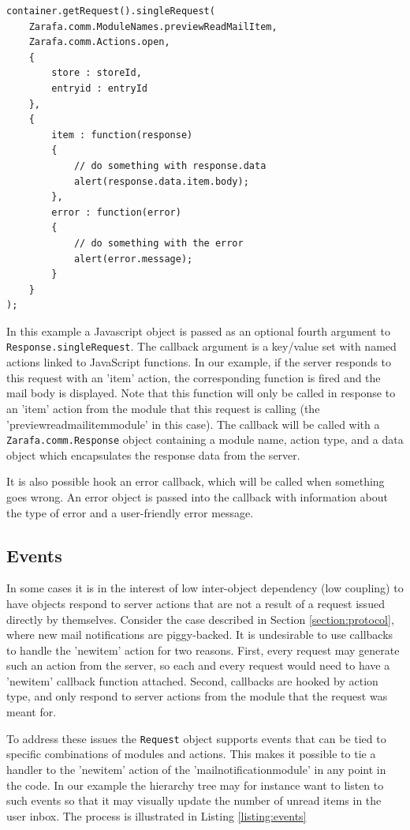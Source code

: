 \begin{lstlisting}[caption={Using callbacks}, label=listing:callbacks]
container.getRequest().singleRequest(
	Zarafa.comm.ModuleNames.previewReadMailItem,
	Zarafa.comm.Actions.open,
	{
		store : storeId,
		entryid : entryId
	},
	{
		item : function(response)
		{
			// do something with response.data
			alert(response.data.item.body);
		},
		error : function(error)
		{
			// do something with the error
			alert(error.message);
		}
	}
);
\end{lstlisting}

In this example a Javascript object is passed as an optional fourth argument to {\tt Response.singleRequest}.
The callback argument is a key/value set with named actions linked to JavaScript functions. In our example,
if the server responds to this request with an 'item' action, the corresponding function is fired and the
mail body is displayed. Note that this function will only be called in response to an 'item' action from
the module that this request is calling (the 'previewreadmailitemmodule' in this case). The callback
will be called with a {\tt Zarafa.comm.Response} object containing a module name, action type, and a data
object which encapsulates the response data from the server.

It is also possible hook an error callback, which will be called when something goes wrong. An error
object is passed into the callback with information about the type of error and a user-friendly error 
message.

\subsection{Events}

In some cases it is in the interest of low inter-object dependency (low coupling) to have objects respond
to server actions that are not a result of a request issued directly by themselves. Consider the case
described in Section \ref{section:protocol}, where new mail notifications are piggy-backed. It is undesirable
to use callbacks to handle the 'newitem' action for two reasons. First, every request may generate such an 
action from the server, so each and every request would need to have a 'newitem' callback function attached. 
Second, callbacks are hooked by action type, and only respond to server actions from the module that the 
request was meant for. 

To address these issues the {\tt Request} object supports events that can be tied to specific combinations
of modules and actions. This makes it possible to tie a handler to the 'newitem' action of the 
'mailnotificationmodule' in any point in the code. In our example the hierarchy tree may for instance want
to listen to such events so that it may visually update the number of unread items in the user inbox.
The process is illustrated in Listing \ref{listing:events}

